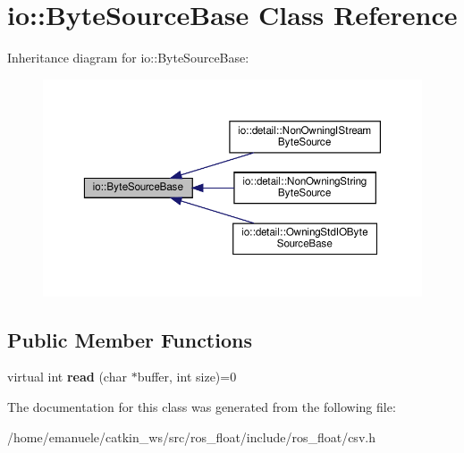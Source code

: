 \hypertarget{classio_1_1ByteSourceBase}{}\section{io\+:\+:Byte\+Source\+Base Class Reference}
\label{classio_1_1ByteSourceBase}


Inheritance diagram for io\+:\+:Byte\+Source\+Base\+:\nopagebreak
\begin{figure}[H]
\begin{center}
\leavevmode
\includegraphics[width=350pt]{classio_1_1ByteSourceBase__inherit__graph}
\end{center}
\end{figure}
\subsection*{Public Member Functions}
\begin{DoxyCompactItemize}
\item 
\mbox{\label{classio_1_1ByteSourceBase_a9598bcc869b79e44da07f0e6fa478615}} 
virtual int {\bfseries read} (char $\ast$buffer, int size)=0
\end{DoxyCompactItemize}


The documentation for this class was generated from the following file\+:\begin{DoxyCompactItemize}
\item 
/home/emanuele/catkin\+\_\+ws/src/ros\+\_\+float/include/ros\+\_\+float/csv.\+h\end{DoxyCompactItemize}
